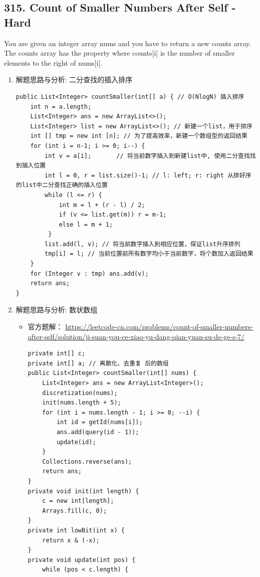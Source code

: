 \documentclass[9pt, b5paaper]{book}
\begin{document}
\subsection{315. Count of Smaller Numbers After Self - Hard}
\label{sec-1-0-3}
You are given an integer array nums and you have to return a new counts array. The counts array has the property where counts[i] is the number of smaller elements to the right of nums[i].
\begin{enumerate}
\item 解题思路与分析: 二分查找的插入排序
\label{sec-1-0-3-1}
\begin{verbatim}
public List<Integer> countSmaller(int[] a) { // O(NlogN) 插入排序
    int n = a.length;
    List<Integer> ans = new ArrayList<>();
    List<Integer> list = new ArrayList<>(); // 新建一个list，用于排序
    int [] tmp = new int [n]; // 为了提高效率，新建一个数组型的返回结果
    for (int i = n-1; i >= 0; i--) {
        int v = a[i];       // 将当前数字插入到新建list中, 使用二分查找找到插入位置
        int l = 0, r = list.size()-1; // l: left; r: right 从排好序的list中二分查找正确的插入位置
        while (l <= r) {
            int m = l + (r - l) / 2;
            if (v <= list.get(m)) r = m-1;
            else l = m + 1;
         }
        list.add(l, v); // 将当前数字插入到相应位置，保证list升序排列
        tmp[i] = l; // 当前位置前所有数字均小于当前数字，将个数加入返回结果
    }
    for (Integer v : tmp) ans.add(v);
    return ans;
}
\end{verbatim}
\item 解题思路与分析: 数状数组
\label{sec-1-0-3-2}
\begin{itemize}
\item 官方题解： \url{https://leetcode-cn.com/problems/count-of-smaller-numbers-after-self/solution/ji-suan-you-ce-xiao-yu-dang-qian-yuan-su-de-ge-s-7/}
\begin{verbatim}
private int[] c;
private int[] a; // 离散化、去重复 后的数组
public List<Integer> countSmaller(int[] nums) {
    List<Integer> ans = new ArrayList<Integer>(); 
    discretization(nums);
    init(nums.length + 5);
    for (int i = nums.length - 1; i >= 0; --i) {
        int id = getId(nums[i]);
        ans.add(query(id - 1));
        update(id);
    }
    Collections.reverse(ans);
    return ans;
}
private void init(int length) {
    c = new int[length];
    Arrays.fill(c, 0);
}
private int lowBit(int x) {
    return x & (-x);
}
private void update(int pos) {
    while (pos < c.length) {

\end{verbatim}
\end{itemize}
\end{enumerate}
\end{document}
